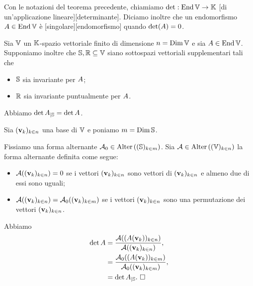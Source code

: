 \begin{Definition}
	Con le notazioni del teorema precedente, chiamiamo $\operatorname{det}: \operatorname{End}{\mathbb{V}} \rightarrow \mathbb{K}$ [di un'applicazione lineare][determinante]. Diciamo inoltre che un endomorfismo $A \in \operatorname{End}{\mathbb{V}}$ \`e [singolare][endomorfismo] quando $\operatorname{det}(A) = 0$.
\end{Definition}
\begin{Theorem}
  Sia $\mathbb{V}$ un $\mathbb{K}$-spazio vettoriale finito di dimensione
  $n = \operatorname{\operatorname{Dim}}{\mathbb{V}}$ e sia
  $A \in \operatorname{End}{\mathbb{V}}$.
  Supponiamo inoltre che
  $\mathbb{S}, \mathbb{R} \subseteq \mathbb{V}$
  siano sottospazi vettoriali supplementari tali che
  \begin{itemize}
    \item $\mathbb{S}$ sia invariante per $A$;
    \item $\mathbb{R}$ sia invariante puntualmente per
      $A$.
  \end{itemize}
  Abbiamo
  $\operatorname{det}{{A}_{|\mathbb{S}}}
  = \operatorname{det}{A}$.
\end{Theorem}
\Proof Sia $(\mathbf{v}_k)_{k \in n}$ una base di $\mathbb{V}$ e poniamo
$m = \operatorname{Dim}{\mathbb{S}}$.
\par Fissiamo una forma alternante
$\mathcal{A}_0 \in
\text{Alter} \left ( (\mathbb{S})_{k \in m} \right )$.
Sia
$\mathcal{A} \in
\text{Alter} \left ( (\mathbb{V})_{k \in n} \right )$
la forma alternante definita come segue:
\begin{itemize}
  \item $\mathcal{A}((\mathbf{v}_k)_{k \in n}) = 0$ se i vettori
    $(\mathbf{v}_k)_{k \in n}$ sono vettori di $(\mathbf{v}_k)_{k \in n}$ e almeno due di
    essi sono uguali;
  \item $\mathcal{A}((\mathbf{v}_k)_{k \in n})
    = \mathcal{A}_0((\mathbf{v}_k)_{k \in m})$ se i vettori
    $(\mathbf{v}_k)_{k \in n}$ sono una permutazione dei vettori
    $(\mathbf{v}_k)_{k \in n}$.
\end{itemize}
\par Abbiamo
\begin{align*}
  \operatorname{det}{A}
  &= \frac{\mathcal{A}((A(\mathbf{v}_k))_{k \in n})}
      {\mathcal{A}((\mathbf{v}_k)_{k \in n})},\\
  &= \frac{\mathcal{A}_0((A(\mathbf{v}_k))_{k \in m})}
      {\mathcal{A}_0((\mathbf{v}_k)_{k \in m})},\\
  &= \operatorname{det}{{A}_{|\mathbb{S}}}.
  \text{ $\square$}
\end{align*}
